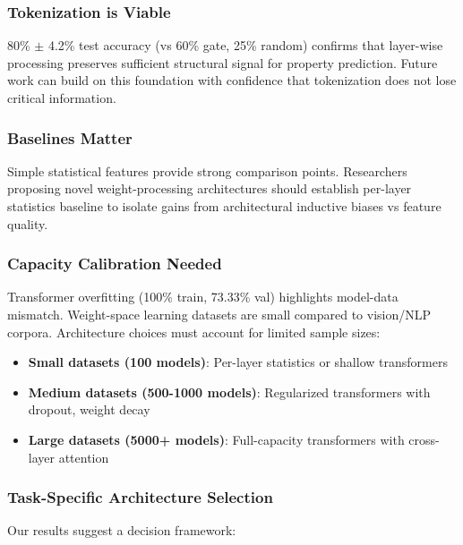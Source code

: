 \subsubsection{Tokenization is Viable}

80\% $\pm$ 4.2\% test accuracy (vs 60\% gate, 25\% random) confirms that layer-wise processing preserves sufficient structural signal for property prediction. Future work can build on this foundation with confidence that tokenization does not lose critical information.

\subsubsection{Baselines Matter}

Simple statistical features provide strong comparison points. Researchers proposing novel weight-processing architectures should establish per-layer statistics baseline to isolate gains from architectural inductive biases vs feature quality.

\subsubsection{Capacity Calibration Needed}

Transformer overfitting (100\% train, 73.33\% val) highlights model-data mismatch. Weight-space learning datasets are small compared to vision/NLP corpora. Architecture choices must account for limited sample sizes:

\begin{itemize}
\item \textbf{Small datasets (100 models)}: Per-layer statistics or shallow transformers
\item \textbf{Medium datasets (500-1000 models)}: Regularized transformers with dropout, weight decay
\item \textbf{Large datasets (5000+ models)}: Full-capacity transformers with cross-layer attention
\end{itemize}

\subsubsection{Task-Specific Architecture Selection}

Our results suggest a decision framework:


